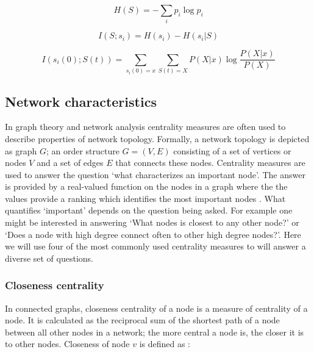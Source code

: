 \documentclass[twoside, twocolumn]{article}
\begin{document}
%		
	

	
	\begin{equation}
	H(S) = - \sum_i p_i \log p_i
	\label{entropy}
	\end{equation}

	\begin{equation}
	I(S; s_i) = H(s_i) - H(s_i \vert S)
	\end{equation}

	\begin{equation}
	I(s_i(0) ; S(t)) = \sum_{s_i(0)=x}  \sum_{S(t) = X} P(X \vert x) \log \frac{P(X \vert x)}{P(X)}
	\label{eq:mi}
	\end{equation}

	\subsection{Network characteristics}
	In graph theory and network analysis centrality measures are often used to describe properties of network topology. Formally, a network topology is depicted as graph $G$; an order structure $G = (V, E)$ consisting of a set of vertices or nodes $V$ and a set of edges $E$ that connects these nodes. Centrality measures are used to answer the question `what characterizes an important node'. The answer is provided by a real-valued function on the nodes in a graph where the the values provide a ranking which identifies the most important nodes \cite{Borgatti2005, Borgatti2006}. 
	What quantifies `important' depends on the question being asked. For example one might be interested in answering `What nodes is closest to any other node?' or `Does a node with high degree connect often to other high degree nodes?'. Here we will use four of the most commonly used centrality measures to will answer a diverse set of questions. 
	
	\subsubsection*{Closeness centrality}
	In connected graphs, closeness centrality of a node is a measure of centrality of a node. It is calculated as the reciprocal sum of the shortest path of a node between all other nodes in a network; the more central a node is, the closer it is to other nodes. Closeness of node $v$ is defined as \cite{Bavalas1950}:
	
\end{document}
